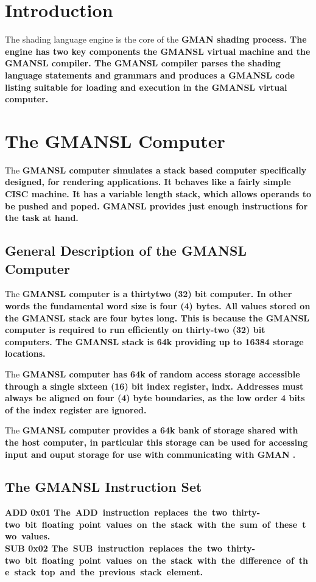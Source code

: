 \documentclass{book}	%
\def\gman{\bf GMAN \rm}
\def\gmansl{\bf GMANSL \rm}
\def\instruction#1#2#3{\bf #1 \hfil\rm #2 \hfill \hbox{#3}\\}
\begin{document}
\section{Introduction}

The shading language engine is the core of the \gman shading
process.  The engine has two key components the \gmansl virtual machine
and the \gmansl compiler.  The \gmansl compiler parses the shading language
statements and grammars and produces a \gmansl code listing suitable for
loading and execution in the \gmansl virtual computer.

\section{The \gmansl Computer}

The \gmansl computer simulates a stack based computer specifically
designed, for rendering applications.  It behaves like a fairly simple
CISC machine.   It has a variable length stack, which allows operands
to be pushed and poped.  \gmansl provides just enough instructions for
the task at hand.

\subsection{General Description of the \gmansl Computer}

The \gmansl computer is a thirtytwo (32) bit computer.  In other words
the fundamental word size is four (4) bytes.  All values stored on the
\gmansl stack are four bytes long.  This is because the \gmansl
computer is required to run efficiently on thirty-two (32) bit
computers.  The \gmansl stack is 64k providing up to 16384 storage
locations. 

The \gmansl computer has 64k of random access storage accessible
through a single sixteen (16) bit index register, indx.  Addresses
must always be aligned on four (4) byte boundaries, as the low order 4
bits of the index register are ignored.

The \gmansl computer provides a 64k bank of storage shared with the
host computer, in particular this storage can be used for accessing
input and ouput storage for use with communicating with \gman.

\subsection{The \gmansl Instruction Set}

\instruction{ADD}{0x01}{The ADD instruction replaces the two
thirty-two bit floating point values on the stack with the sum of
these two values.}
\instruction{SUB}{0x02}{The SUB instruction replaces the two
thirty-two bit floating point values on the stack with the difference
of the stack top and the previous stack element.}
\end{document}
